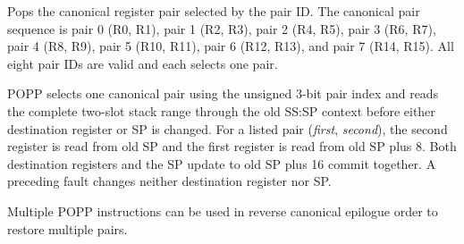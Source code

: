 Pops the canonical register pair selected by the pair ID. The canonical pair sequence is pair 0 (R0, R1), pair 1 (R2, R3), pair 2 (R4, R5), pair 3 (R6, R7), pair 4 (R8, R9), pair 5 (R10, R11), pair 6 (R12, R13), and pair 7 (R14, R15). All eight pair IDs are valid and each selects one pair.

POPP selects one canonical pair using the unsigned 3-bit pair index and reads the complete two-slot stack range
through the old SS:SP context before either destination register or SP is changed. For a listed pair
(\emph{first}, \emph{second}), the second register is read from old SP and the first register is read from old SP
plus 8. Both destination registers and the SP update to old SP plus 16 commit together. A preceding fault changes
neither destination register nor SP.

Multiple POPP instructions can be used in reverse canonical epilogue order to restore multiple pairs.

